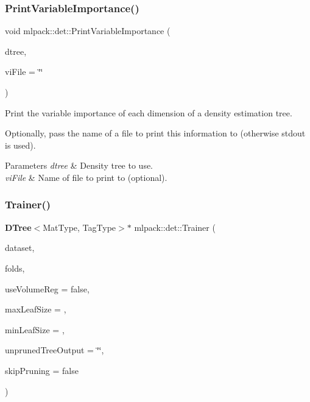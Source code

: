\subsubsection{Print\+Variable\+Importance()}
{\footnotesize\ttfamily void mlpack\+::det\+::\+Print\+Variable\+Importance (\begin{DoxyParamCaption}\item[{const \textbf{ D\+Tree}$<$ Mat\+Type, Tag\+Type $>$ $\ast$}]{dtree,  }\item[{const std\+::string}]{vi\+File = {\ttfamily \char`\"{}\char`\"{}} }\end{DoxyParamCaption})}



Print the variable importance of each dimension of a density estimation tree. 

Optionally, pass the name of a file to print this information to (otherwise stdout is used).


\begin{DoxyParams}{Parameters}
{\em dtree} & Density tree to use. \\
\hline
{\em vi\+File} & Name of file to print to (optional). \\
\hline
\end{DoxyParams}
\mbox{\label{namespacemlpack_1_1det_a4a84945ed0d2a629c86f8538e6e7090c}} 
\subsubsection{Trainer()}
{\footnotesize\ttfamily \textbf{ D\+Tree}$<$Mat\+Type, Tag\+Type$>$$\ast$ mlpack\+::det\+::\+Trainer (\begin{DoxyParamCaption}\item[{Mat\+Type \&}]{dataset,  }\item[{const size\+\_\+t}]{folds,  }\item[{const bool}]{use\+Volume\+Reg = {\ttfamily false},  }\item[{const size\+\_\+t}]{max\+Leaf\+Size = {},  }\item[{const size\+\_\+t}]{min\+Leaf\+Size = {},  }\item[{const std\+::string}]{unpruned\+Tree\+Output = {\ttfamily \char`\"{}\char`\"{}},  }\item[{const bool}]{skip\+Pruning = {\ttfamily false} }\end{DoxyParamCaption})}



